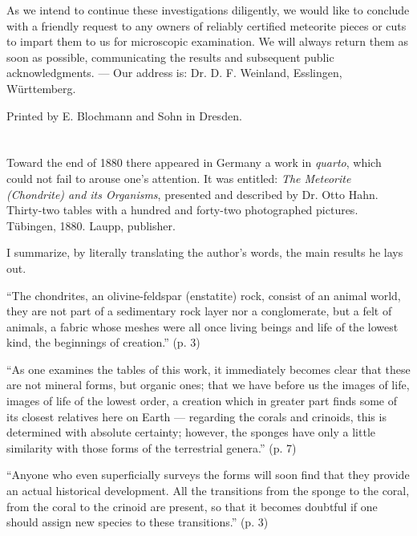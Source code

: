 \documentclass[a4paper, 12pt, oneside]{article}
\begin{document}
As we intend to continue these investigations diligently, we would like to conclude with a friendly request to any owners of reliably certified meteorite pieces or cuts to impart them to us for microscopic examination. We will always return them as soon as possible, communicating the results and subsequent public acknowledgments. --- Our address is: Dr. D. F. Weinland, Esslingen, Württemberg.

Printed by E. Blochmann and Sohn in Dresden.
\clearpage
\section{}
\paragraph*{}
Toward the end of 1880 there appeared in Germany a work in \emph{quarto}, which could not fail to arouse one's attention. It was entitled: \emph{The Meteorite (Chondrite) and its Organisms}, presented and described by Dr. Otto Hahn. Thirty-two tables with a hundred and forty-two photographed pictures. Tübingen, 1880. Laupp, publisher.

I summarize, by literally translating the author's words, the main results he lays out.

``The chondrites, an olivine-feldspar (enstatite) rock, consist of an animal world, they are not part of a sedimentary rock layer nor a conglomerate, but a felt of animals, a fabric whose meshes were all once living beings and life of the lowest kind, the beginnings of creation.'' (p. 3)

``As one examines the tables of this work, it immediately becomes clear that these are not mineral forms, but organic ones; that we have before us the images of life, images of life of the lowest order, a creation which in greater part finds some of its closest relatives here on Earth --- regarding the corals and crinoids, this is determined with absolute certainty; however, the sponges have only a little similarity with those forms of the terrestrial genera.'' (p. 7)

``Anyone who even superficially surveys the forms will soon find that they provide an actual historical development. All the transitions from the sponge to the coral, from the coral to the crinoid are present, so that it becomes doubtful if one should assign new species to these transitions.'' (p. 3)
\end{document}
